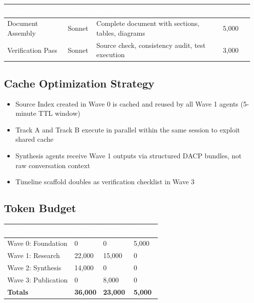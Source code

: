 \documentclass[11pt,letterpaper]{article}
\newcommand{\tableheader}[1]{\textbf{\sffamily\textcolor{white}{#1}}}
\begin{document}
\begin{center}
\begin{tabularx}{\textwidth}{L{3.5cm}C{1.5cm}XC{2cm}}
\toprule
{}
\tableheader{Task} & \tableheader{Model} & \tableheader{Output} & \tableheader{Tokens} \\
\midrule
Document Assembly & Sonnet & Complete document with sections, tables, diagrams & 5,000 \\
Verification Pass & Sonnet & Source check, consistency audit, test execution & 3,000 \\
\bottomrule
\end{tabularx}
\end{center}

\subsection{Cache Optimization Strategy}

\begin{itemize}[leftmargin=2em]
\item Source Index created in Wave 0 is cached and reused by all Wave 1 agents (5-minute TTL window)
\item Track A and Track B execute in parallel within the same session to exploit shared cache
\item Synthesis agents receive Wave 1 outputs via structured DACP bundles, not raw conversation context
\item Timeline scaffold doubles as verification checklist in Wave 3
\end{itemize}

\subsection{Token Budget}

\begin{center}
\begin{tabularx}{\textwidth}{L{4cm}C{2cm}C{2cm}C{2cm}}
\toprule
{}
\tableheader{Wave} & \tableheader{Opus} & \tableheader{Sonnet} & \tableheader{Haiku} \\
\midrule
Wave 0: Foundation & 0 & 0 & 5,000 \\
Wave 1: Research & 22,000 & 15,000 & 0 \\
Wave 2: Synthesis & 14,000 & 0 & 0 \\
Wave 3: Publication & 0 & 8,000 & 0 \\
\midrule
\textbf{Totals} & \textbf{36,000} & \textbf{23,000} & \textbf{5,000} \\
\bottomrule
\end{tabularx}
\end{center}
\end{document}
